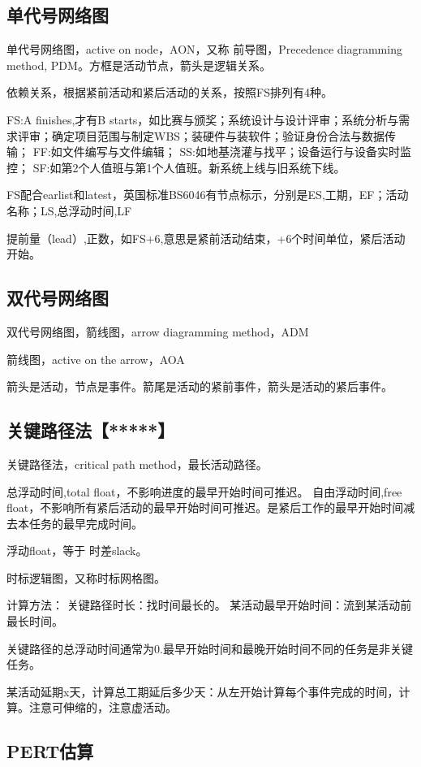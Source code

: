 \documentclass[UTF8]{../computerUniverse}
\begin{document}
\subsection{单代号网络图}
单代号网络图，active on node，AON，又称
前导图，Precedence diagramming method, PDM。方框是活动节点，箭头是逻辑关系。

依赖关系，根据紧前活动和紧后活动的关系，按照FS排列有4种。

FS:A finishes,才有B starts，如比赛与颁奖；系统设计与设计评审；系统分析与需求评审；确定项目范围与制定WBS；装硬件与装软件；验证身份合法与数据传输；
FF:如文件编写与文件编辑；
SS:如地基浇灌与找平；设备运行与设备实时监控；
SF:如第2个人值班与第1个人值班。新系统上线与旧系统下线。

FS配合earlist和latest，英国标准BS6046有节点标示，分别是ES,工期，EF；活动名称；LS,总浮动时间,LF

提前量（lead）,正数，如FS+6,意思是紧前活动结束，+6个时间单位，紧后活动开始。

\subsection{双代号网络图}
双代号网络图，箭线图，arrow diagramming method，ADM

箭线图，active on the arrow，AOA

箭头是活动，节点是事件。箭尾是活动的紧前事件，箭头是活动的紧后事件。

\subsection{关键路径法【*****】}
关键路径法，critical path method，最长活动路径。

总浮动时间,total float，不影响进度的最早开始时间可推迟。
自由浮动时间,free float，不影响所有紧后活动的最早开始时间可推迟。是紧后工作的最早开始时间减去本任务的最早完成时间。

浮动float，等于 时差slack。

时标逻辑图，又称时标网格图。

计算方法：
关键路径时长：找时间最长的。
某活动最早开始时间：流到某活动前最长时间。

关键路径的总浮动时间通常为0.最早开始时间和最晚开始时间不同的任务是非关键任务。

某活动延期x天，计算总工期延后多少天：从左开始计算每个事件完成的时间，计算。注意可伸缩的，注意虚活动。

\subsection{PERT估算}
\end{document}
